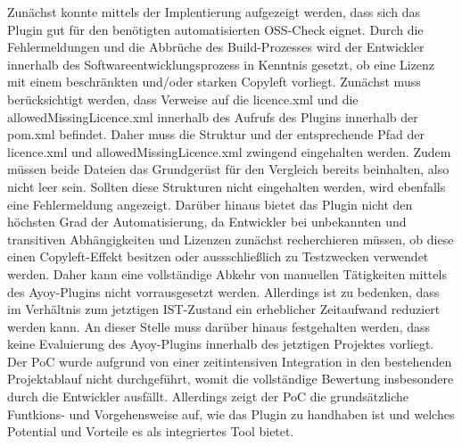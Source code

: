 Zunächst konnte mittels der Implentierung aufgezeigt werden, dass sich das Plugin gut für den benötigten automatisierten OSS-Check eignet. Durch die Fehlermeldungen und die Abbrüche des Build-Prozesses wird der Entwickler innerhalb des Softwareentwicklungsprozess in Kenntnis gesetzt, ob eine Lizenz mit einem beschränkten und/oder starken Copyleft vorliegt. Zunächst muss berücksichtigt werden, dass Verweise auf die licence.xml und die allowedMissingLicence.xml innerhalb des Aufrufs des Plugins innerhalb der pom.xml befindet. Daher muss die Struktur und der entsprechende Pfad der licence.xml und allowedMissingLicence.xml zwingend eingehalten werden. Zudem müssen beide Dateien das Grundgerüst für den Vergleich bereits beinhalten, also nicht leer sein. Sollten diese Strukturen nicht eingehalten werden, wird ebenfalls eine Fehlermeldung angezeigt. Darüber hinaus bietet das Plugin nicht den höchsten Grad der Automatisierung, da Entwickler bei unbekannten und transitiven Abhängigkeiten und Lizenzen zunächst recherchieren müssen, ob diese einen Copyleft-Effekt besitzen oder aussschließlich zu Testzwecken verwendet werden. Daher kann eine vollständige Abkehr von manuellen Tätigkeiten mittels des Ayoy-Plugins nicht vorrausgesetzt werden. Allerdings ist zu bedenken, dass im Verhältnis zum jetztigen IST-Zustand ein erheblicher Zeitaufwand reduziert werden kann. 
An dieser Stelle muss darüber hinaus festgehalten werden, dass keine Evaluierung des Ayoy-Plugins innerhalb des jetztigen Projektes vorliegt. Der PoC wurde aufgrund von einer zeitintensiven Integration in den bestehenden Projektablauf nicht durchgeführt, womit die vollständige Bewertung insbesondere durch die Entwickler ausfällt. Allerdings zeigt der PoC die grundsätzliche Funtkions- und Vorgehensweise auf, wie das Plugin zu handhaben ist und welches Potential und Vorteile es als integriertes Tool bietet.
 